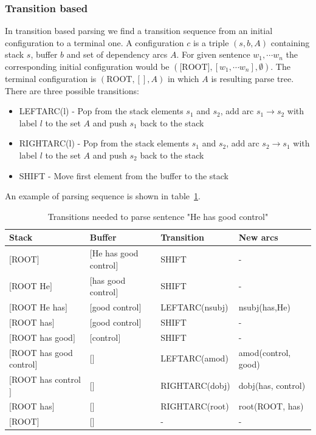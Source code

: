 \subsubsection{Transition based}
In transition based parsing we find a transition sequence from an initial configuration
to a terminal one. A configuration $c$ is a triple $(s, b, A)$ containing stack $s$,
buffer $b$ and set of dependency arcs $A$. For given sentence $w_1, \cdots w_n$
the corresponding initial configuration would be $(\text{[ROOT]}, [w_1, \cdots w_n], \emptyset)$.
The terminal configuration is $(\text{ROOT}, [], A)$ in which $A$ is resulting parse tree.
There are three possible transitions:
\begin{itemize}
    \item {\ttfamily LEFTARC(l)} - Pop from the stack elements $s_1$ and $s_2$,
        add arc $s_1 \rightarrow s_2$ with label $l$ to the set $A$ and push $s_1$ back
        to the stack
    \item {\ttfamily RIGHTARC(l)} - Pop from the stack elements $s_1$ and $s_2$,
        add arc $s_2 \rightarrow s_1$ with label $l$ to the set $A$ and push $s_2$ back
        to the stack
    \item {\ttfamily SHIFT} - Move first element from the buffer to the stack
\end{itemize}
An example of parsing sequence is shown in table~\ref{tab:transition_parse}.
\begin{table}[!htbp]
    \centering
{\footnotesize
    \begin{tabular}{l | l | l | l}
        Stack & Buffer & Transition & New arcs \\ \hline
        $[$ROOT$]$ & $[$He has good control$]$ & {\ttfamily SHIFT} & - \\
        $[$ROOT He$]$ & $[$has good control$]$ & {\ttfamily SHIFT} & - \\
        $[$ROOT He has$]$ & $[$good control$]$ & {\ttfamily LEFTARC(nsubj)} & nsubj(has,He) \\
        $[$ROOT has$]$ & $[$good control$]$ & {\ttfamily SHIFT} & - \\
        $[$ROOT has good$]$ & $[$control$]$ & {\ttfamily SHIFT} & - \\
        $[$ROOT has good control$]$ & $[$$]$ & {\ttfamily LEFTARC(amod)} & amod(control, good) \\
        $[$ROOT has control$]$ & $[$$]$ & {\ttfamily RIGHTARC(dobj)} & dobj(has, control) \\
        $[$ROOT has$]$ & $[$$]$ & {\ttfamily RIGHTARC(root)} & root(ROOT, has) \\
        $[$ROOT$]$ & $[$$]$ & - & - \\
    \end{tabular}
}
    \caption{Transitions needed to parse sentence "He has good control"}
    \label{tab:transition_parse}
\end{table}

